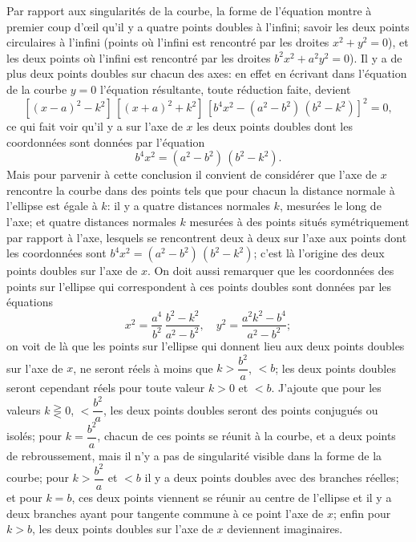 \documentclass[11pt,a4paper]{book}
\begin{document}
Par rapport aux singularit\'{e}s de la courbe, la forme de l'\'{e}quation montre \`{a} premier coup d'\oe il qu'il y a quatre points doubles \`{a} l'infini; savoir les deux points circulaires \`{a} l'infini (points o\`{u} l'infini est rencontr\'{e} par les droites $x^2+y^2=0$), et les deux points o\`{u} l'infini est rencontr\'{e} par les droites $b^2x^2+a^2y^2=0$). Il y a de plus deux points doubles sur chacun des axes: en effet en \'{e}crivant dans l'\'{e}quation de la courbe $y=0$ l'\'{e}quation r\'{e}sultante, toute r\'{e}duction faite, devient
\[
[(x-a)^2-k^2]\,[(x+a)^2+k^2]\,[b^4x^2-(a^2-b^2)\,(b^2-k^2)]^2 = 0,
\]
ce qui fait voir qu'il y a sur l'axe de $x$ les deux points doubles dont les coordonn\'{e}es sont donn\'{e}es par l'\'{e}quation
\[
b^4x^2 = (a^2-b^2)\,(b^2-k^2).
\]
Mais pour parvenir \`{a} cette conclusion il convient de consid\'{e}rer que l'axe de $x$ rencontre la courbe dans des points tels que pour chacun la distance normale \`{a} l'ellipse est \'{e}gale \`{a} $k$: il y a quatre distances normales $k$, mesur\'{e}es le long de l'axe; et quatre distances normales $k$ mesur\'{e}es \`{a} des points situ\'{e}s sym\'{e}triquement par rapport \`{a} l'axe, lesquels se rencontrent deux \`{a} deux sur l'axe aux points dont les coordonn\'{e}es sont $b^4x^2 = (a^2-b^2)\,(b^2-k^2)$; c'est l\`{a} l'origine des deux points doubles sur l'axe de $x$. On doit aussi remarquer que les coordonn\'{e}es des points sur l'ellipse qui correspondent \`{a} ces points doubles sont donn\'{e}es par les \'{e}quations
\[
x^2 = \frac{a^4}{b^2}\,\frac{b^2-k^2}{a^2-b^2}, \quad y^2 = \frac{a^2k^2-b^4}{a^2-b^2};
\]
on voit de l\`{a} que les points sur l'ellipse qui donnent lieu aux deux points doubles sur l'axe de $x$, ne seront r\'{e}els \`{a} moins que $k > \dfrac{b^2}{a}$, $< b$; les deux points doubles seront cependant r\'{e}els pour toute valeur $k > 0$ et $< b$. J'ajoute que pour les valeurs $k \gtreqless 0$, $< \dfrac{b^2}{a}$, les deux points doubles seront des points conjugu\'{e}s ou isol\'{e}s; pour $k = \dfrac{b^2}{a}$, chacun de ces points se r\'{e}unit \`{a} la courbe, et a deux points de rebroussement, mais il n'y a pas de singularit\'{e} visible dans la forme de la courbe; pour $k > \dfrac{b^2}{a}$ et $< b$ il y a deux points doubles avec des branches r\'{e}elles; et pour $k = b$, ces deux points viennent se r\'{e}unir au centre de l'ellipse et il y a deux branches ayant pour tangente commune \`{a} ce point l'axe de $x$; enfin pour $k > b$, les deux points doubles sur l'axe de $x$ deviennent imaginaires.
\end{document}
